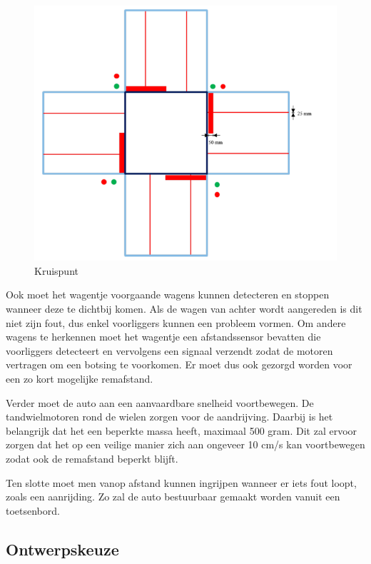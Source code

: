\documentclass[a4paper,twoside,kulak]{kulakreport} %
\begin{document}
\begin{figure}
	\centering
	\includegraphics[width=.6\textwidth]{volglijnenEnStoplijnen}
	\caption{Kruispunt}
	\label{fig:plattegrond}
\end{figure}

Ook moet het wagentje voorgaande wagens kunnen detecteren en stoppen wanneer deze te dichtbij komen. Als de wagen van achter wordt aangereden is dit niet zijn fout, dus enkel voorliggers kunnen een probleem vormen. Om andere wagens te herkennen moet het wagentje een afstandssensor bevatten die voorliggers detecteert en vervolgens een signaal verzendt zodat de motoren vertragen om een botsing te voorkomen. Er moet dus ook gezorgd worden voor een zo kort mogelijke remafstand.

Verder moet de auto aan een aanvaardbare snelheid voortbewegen. De tandwielmotoren rond de wielen zorgen voor de aandrijving. Daarbij is het belangrijk dat het een beperkte massa heeft, maximaal 500 gram. Dit zal ervoor zorgen dat het op een veilige manier zich aan ongeveer 10 cm/s kan voortbewegen zodat ook de remafstand beperkt blijft.

Ten slotte moet men vanop afstand kunnen ingrijpen wanneer er iets fout loopt, zoals een aanrijding. Zo zal de auto bestuurbaar gemaakt worden vanuit een toetsenbord.






\subsection{Ontwerpskeuze}
\end{document}
